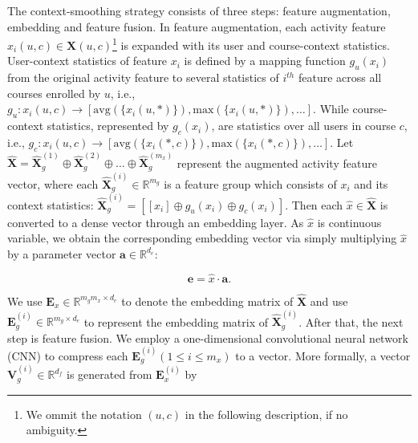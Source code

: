 The context-smoothing strategy consists of three steps: feature augmentation, embedding and feature fusion. 
In feature augmentation, each activity feature $x_i(u,c) \in \textbf{X}(u,c)$\footnote{We ommit the notation $(u,c)$ in the following description, if no ambiguity.} is expanded with its user and course-context statistics. 
User-context statistics of feature $x_i$ is defined by a mapping function $g_u(x_i)$ from the original activity feature to several statistics of $i^{th}$ feature across all courses enrolled by $u$, i.e., 
 $g_u: x_i(u,c) \rightarrow [\text{avg}(\{x_i(u,*)\}), \text{max}(\{x_i(u,*)\}),\ldots]$.
 While course-context statistics, represented by $g_c(x_i)$, are statistics over all users in course $c$, i.e.,
  $g_c: x_i(u,c) \rightarrow [\text{avg}(\{x_i(*,c)\}), \text{max}(\{x_i(*,c)\}),\ldots]$.
  Let  
  $\hat{\mathbf{X}}= \hat{\mathbf{X}}^{(1)}_{g} \oplus \hat{\mathbf{X}}^{(2)}_{g}\oplus \ldots \oplus \hat{\mathbf{X}}^{(m_x)}_{g}$ represent the augmented activity feature vector, where each $\hat{\textbf{X}}^{(i)}_{g}\in \mathbb{R}^{m_g}$ is a feature group which consists of $x_i$ and its context statistics:
  $\hat{\mathbf{X}}^{(i)}_{g}=[[x_i] \oplus g_u(x_i) \oplus g_c(x_i)]$.
  Then each $\hat{x}\in \hat{\mathbf{X}}$ is converted to a dense vector through an embedding layer. 
  As $\hat{x}$ is continuous variable, 
  we obtain the corresponding embedding vector via simply multiplying $\hat{x}$ by a parameter vector $\mathbf{a}\in \mathbb{R}^{d_e}$:
  
\begin{equation}
\label{equ:emb}
\mathbf{e}= \hat{x} \cdot \mathbf{a}.
\end{equation}

We use $\mathbf{E}_x \in \mathbb{R}^{m_gm_x \times d_e}$ to denote the embedding matrix of $\hat{\mathbf{X}}$ and use $\mathbf{E}_g^{(i)} \in \mathbb{R}^{m_g \times d_e}$ to represent the embedding matrix of $\hat{\textbf{X}}^{(i)}_{g}$.
After that, the next step is feature fusion. We employ a one-dimensional convolutional neural network (CNN) to compress each $\mathbf{E}_g^{(i)} (1 \leq i \leq m_x)$ to a vector. More formally, a vector $\mathbf{V}_g^{(i)} \in \mathbb{R}^{d_f}$ is generated from $\mathbf{E}^{(i)}_x$ by

